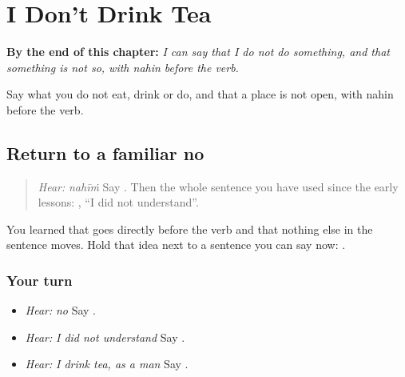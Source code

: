 
\chapter{I Don't Drink Tea}
\label{ch:pa-a2-negate}

\begin{chapteropening}
\textbf{By the end of this chapter:} \emph{I can say that I do not do something, and that something is not so, with nahin before the verb.}

Say what you do not eat, drink or do, and that a place is not open, with nahin before the verb.
\end{chapteropening}

\section[\texorpdfstring{\pa{ਨਹੀਂ} · \pa{ਮੈਨੂੰ} \pa{ਸਮਝ} \pa{ਨਹੀਂ} … (nahīṁ · mainūṁ …)}{ਨਹੀਂ · ਮੈਨੂੰ ਸਮਝ ਨਹੀਂ … (nahīṁ · mainūṁ …)}]{Return to a familiar no}

\label{lesson:PA-C212-nahin-return}



\begin{quote}
\emph{Hear:} \emph{nahīṁ} Say \textbf{}. Then the whole sentence you have used since the early lessons: \textbf{   }, \textquotedblleft{}I did not understand\textquotedblright{}.
\end{quote}

\begin{grammarlens}[title={Grammar Lens}]
You learned that \textbf{} goes directly before the verb and that nothing else in the sentence moves. Hold that idea next to a sentence you can say now: \textbf{   }.
\end{grammarlens}

\subsection*{Your turn}
\begin{itemize}
\raggedright
  \item \emph{Hear:} \emph{no} Say \textbf{}.
  \item \emph{Hear:} \emph{I did not understand} Say \textbf{   }.
  \item \emph{Hear:} \emph{I drink tea, as a man} Say \textbf{   }.
\end{itemize}

